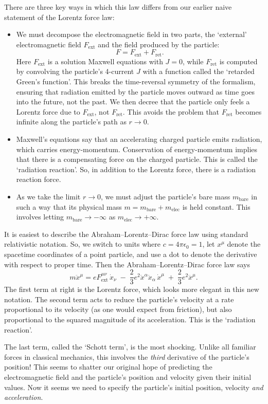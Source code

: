 \documentclass[12pt]{article}
\newcommand{\bare}{\mathrm{bare}}
\newcommand{\elec}{\mathrm{elec}}
\newcommand{\ret}{\mathrm{ret}}
\newcommand{\ext}{\mathrm{ext}}
\begin{document}
There are three key ways in which this law differs from our earlier naive statement of the Lorentz force law: 
\begin{itemize}
\item 
We must decompose the electromagnetic field in two parts, the `external' electromagnetic field $F_\ext$ and the field produced by the particle:
\[             F = F_\ext + F_\ret .  \]
Here $F_\ext$ is a solution Maxwell equations with $J = 0$, while $F_\ret$ is computed by convolving the particle's 4-current $J$ with a function called the `retarded Green's function'.  This breaks the time-reversal symmetry of the formalism, ensuring that radiation emitted by the particle moves outward as time goes into the future, not the past.   We then decree that the particle only feels a Lorentz force due to $F_\ext$, not $F_\ret$.  This avoids the problem that $F_\ret$ becomes infinite along the particle's path as $r \to 0$.
\item
Maxwell's equations say that an accelerating charged particle emits radiation, which carries energy-momentum.   Conservation of energy-momentum implies that there is a compensating force on the charged particle.  This is called the `radiation reaction'.  
So, in addition to the Lorentz force, there is a radiation reaction force.
\item 
As we take the limit $r \to 0$, we must adjust the particle's bare mass $m_\bare$ in 
such a way that its physical mass $m = m_\bare + m_\elec$ is held constant.   This involves letting $m_\bare \to -\infty$ as $m_\elec \to +\infty$.
\end{itemize}

It is easiest to describe the Abraham--Lorentz--Dirac force law using standard relativistic notation.  So, we switch to units where $c = 4 \pi \epsilon_0 = 1$, let $x^\mu$ denote the spacetime coordinates of a point particle, and use a dot to denote the derivative with respect to proper time.  Then the Abraham--Lorentz--Dirac force law says
\[   m \ddot{x}^\mu = e F_{\mathrm{ext}}^{\mu \nu} \,\dot{x}_\nu \; - \; 
\frac{2}{3}e^2 \ddot{x}^\alpha \ddot{x}_\alpha  \, \dot{x}^\mu \; + \; 
\frac{2}{3}e^2 \dddot{x}^\mu .\]
The first term at right is the Lorentz force, which looks more elegant in this new notation.  The second term acts to reduce the particle's velocity at a rate proportional to its velocity (as one would expect from friction), but also proportional to the squared magnitude of its acceleration.  This is the `radiation reaction'.

The last term, called the `Schott term', is the most shocking.  Unlike all familiar forces in classical mechanics, this involves the \emph{third} derivative of the particle's position!  This seems to shatter our original hope of predicting the electromagnetic field and the particle's position and velocity given their initial values.   Now it seems we need to specify the particle's initial position, velocity \emph{and acceleration}.  
\end{document}
